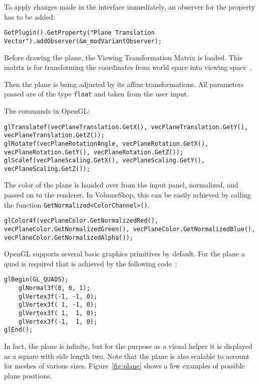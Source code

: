 
To apply changes made in the interface immediately, an observer for the property has to be added:
\begin{lstlisting}
GetPlugin().GetProperty("Plane Translation Vector").addObserver(&m_modVariantObserver);
\end{lstlisting}

Before drawing the plane, the Viewing Transformation Matrix is loaded. This matrix is for transforming the coordinates from world space into viewing space~\cite{book:computerGraphicsHearn}.

Then the plane is being adjusted by its affine transformations. All parameters passed are of the type \texttt{float} and taken from the user input.

The commands in OpenGL:
\begin{lstlisting}
glTranslatef(vecPlaneTranslation.GetX(), vecPlaneTranslation.GetY(), vecPlaneTranslation.GetZ());
glRotatef(vecPlaneRotationAngle, vecPlaneRotation.GetX(), vecPlaneRotation.GetY(), vecPlaneRotation.GetZ());
glScalef(vecPlaneScaling.GetX(), vecPlaneScaling.GetY(), vecPlaneScaling.GetZ());
\end{lstlisting}

The color of the plane is handed over from the input panel, normalized, and passed on to the renderer. In VolumeShop, this can be easily achieved by calling the function \texttt{GetNormalized<ColorChannel>()}.
\begin{lstlisting}
glColor4f(vecPlaneColor.GetNormalizedRed(), vecPlaneColor.GetNormalizedGreen(), vecPlaneColor.GetNormalizedBlue(), vecPlaneColor.GetNormalizedAlpha());
\end{lstlisting}

OpenGL supports several basic graphics primitives by default. For the plane a quad is required that is achieved by the following code~\cite{book:computerGraphicsHill}: %
\begin{lstlisting}
glBegin(GL_QUADS);
	glNormal3f(0, 0, 1);
	glVertex3f(-1, -1, 0);
	glVertex3f( 1, -1, 0);
	glVertex3f( 1,  1, 0);
	glVertex3f(-1,  1, 0);
glEnd();
\end{lstlisting}

In fact, the plane is infinite, but for the purpose as a visual helper it is displayed as a square with side length two. Note that the plane is also scalable to account for meshes of various sizes. Figure~\ref{fig:plane} shows a few examples of possible plane positions.

